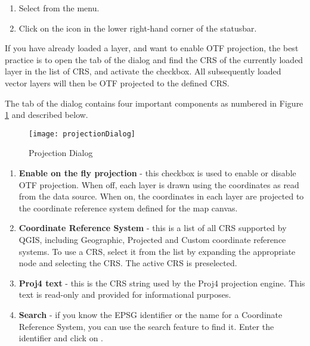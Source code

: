 \begin{enumerate}
\item Select  from the
 menu.
\item Click on the  icon in the
lower right-hand corner of the statusbar.
\end{enumerate}

If you have already loaded a layer, and want to enable OTF projection, the
best practice is to open the  tab of the
 dialog and find the CRS of the currently loaded
layer in the list of CRS, and activate the  checkbox. All subsequently loaded vector layers will then be OTF
projected to the defined CRS.

The  tab of the 
dialog contains four important components as numbered in Figure
\ref{fig:projections} and described below.

\begin{figure}[ht]
   \begin{center}
   \caption{Projection Dialog \nixcaption}\label{fig:projections}\smallskip
   \texttt{[image: projectionDialog]}
\end{center}  
\end{figure}

\begin{enumerate}
\item \textbf{Enable on the fly projection} -
this checkbox is used to enable or disable OTF projection. When off, each
layer is drawn using the coordinates as read from the data source. When on,
the coordinates in each layer are projected to the coordinate reference
system defined for the map canvas.
\item \textbf{Coordinate Reference System} - this is a list of all CRS
supported by QGIS, including Geographic, Projected and Custom coordinate
reference systems. To use a CRS, select it from the list by expanding
the appropriate node and selecting the CRS. The active CRS is preselected.
\item \textbf{Proj4 text} - this is the CRS string used by the Proj4
projection engine. This text is read-only and provided for informational
purposes.
\item \textbf{Search} - if you know the EPSG identifier or the name 
for a Coordinate Reference System, you can use the search feature to find it.
Enter the identifier and click on .
\end{enumerate}

